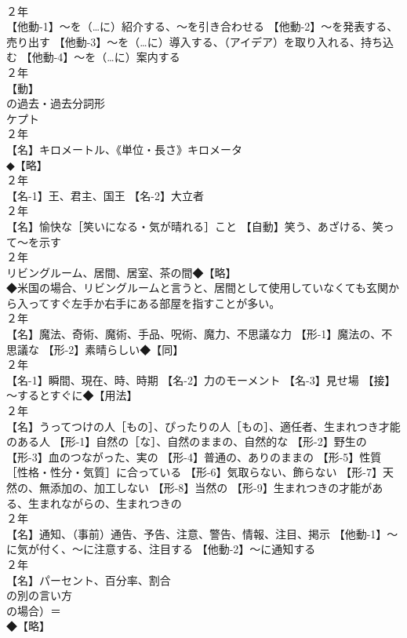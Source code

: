 \documentclass[8pt]{extreport}
\begin{document}
\begin{CJK}{UTF8}{min}
\\	２年	
\\	【他動-1】～を（…に）紹介する、～を引き合わせる 【他動-2】～を発表する、売り出す 【他動-3】～を（…に）導入する、（アイデア）を取り入れる、持ち込む 【他動-4】～を（…に）案内する
\\	２年	
\\	【動】
\\	の過去・過去分詞形 
\\	ケプト
\\	２年	
\\	【名】キロメートル、《単位・長さ》キロメータ
\\	◆【略】
\\	２年	
\\	【名-1】王、君主、国王 【名-2】大立者
\\	２年	
\\	【名】愉快な［笑いになる・気が晴れる］こと 【自動】笑う、あざける、笑って～を示す
\\	２年	
\\	リビングルーム、居間、居室、茶の間◆【略】
\\	◆米国の場合、リビングルームと言うと、居間として使用していなくても玄関から入ってすぐ左手か右手にある部屋を指すことが多い。
\\	２年	
\\	【名】魔法、奇術、魔術、手品、呪術、魔力、不思議な力 【形-1】魔法の、不思議な 【形-2】素晴らしい◆【同】
\\	２年	
\\	【名-1】瞬間、現在、時、時期 【名-2】力のモーメント 【名-3】見せ場 【接】～するとすぐに◆【用法】
\\	２年	
\\	【名】うってつけの人［もの］、ぴったりの人［もの］、適任者、生まれつき才能のある人 【形-1】自然の［な］、自然のままの、自然的な 【形-2】野生の 【形-3】血のつながった、実の 【形-4】普通の、ありのままの 【形-5】性質［性格・性分・気質］に合っている 【形-6】気取らない、飾らない 【形-7】天然の、無添加の、加工しない 【形-8】当然の 【形-9】生まれつきの才能がある、生まれながらの、生まれつきの
\\	２年	
\\	【名】通知、（事前）通告、予告、注意、警告、情報、注目、掲示 【他動-1】～に気が付く、～に注意する、注目する 【他動-2】～に通知する
\\	２年	
\\	【名】パーセント、百分率、割合
\\	の別の言い方
\\	の場合）＝
\\	◆【略】

\end{CJK}
\end{document}
